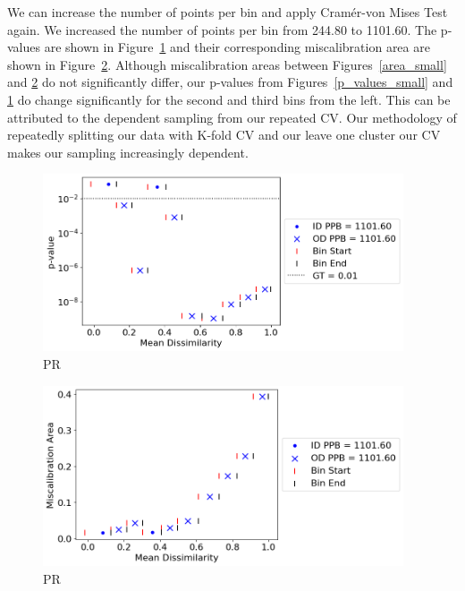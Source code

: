 \par We can increase the number of points per bin and apply Cram\'er-von Mises Test again. We increased the number of points per bin from 244.80 to 1101.60. The p-values are shown in Figure~\ref{p_values_large} and their corresponding miscalibration area are shown in Figure~\ref{area_large}. Although miscalibration areas between Figures~\ref{area_small} and \ref{area_large} do not significantly differ, our p-values from Figures~\ref{p_values_small} and \ref{p_values_large} do change significantly for the second and third bins from the left. This can be attributed to the dependent sampling from our repeated CV. Our methodology of repeatedly splitting our data with K-fold CV and our leave one cluster our CV makes our sampling increasingly dependent.

\begin{figure}[H]
\centering
\includegraphics[width=0.95\textwidth]{figures/p_values_large.png}
\caption{PR}
\label{p_values_large}
\end{figure}

\begin{figure}[H]
\centering
\includegraphics[width=0.95\textwidth]{figures/area_large.png}
\caption{PR}
\label{area_large}
\end{figure}